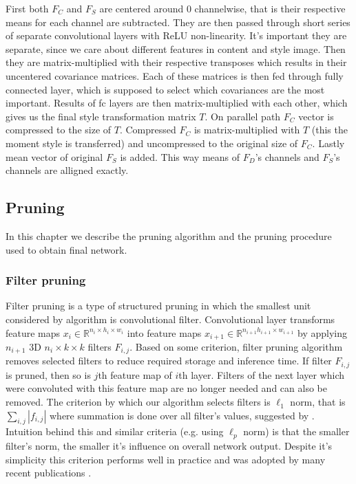 \documentclass[../Main.tex]{subfiles}
\begin{document}
    First both $F_C$ and $F_S$ are centered around 0 channelwise, that is their respective 
    means for each channel are subtracted. They are then passed through short series of separate 
    convolutional layers with ReLU non-linearity. It's important they are separate,
    since we care about different features in content and style image. Then they 
    are matrix-multiplied with their respective transposes which results in
    their uncentered covariance matrices. Each of these matrices is then fed 
    through fully connected layer, which is supposed to select which covariances
    are the most important. Results of fc layers are then matrix-multiplied
    with each other, which gives us the final style transformation matrix $T$.
    On parallel path $F_C$ vector is compressed to the size of $T$. Compressed 
    $F_C$ is matrix-multiplied with $T$ (this the moment style is transferred)
    and uncompressed to the original size of $F_C$. Lastly mean vector of original $F_S$
    is added. This way means of $F_D$'s channels and $F_S$'s channels are alligned
    exactly.
    
    
    
    
    
    
    
    

\subsection{Pruning}
    In this chapter we describe the pruning algorithm and the pruning procedure 
    used to obtain final network.
    \subsubsection{Filter pruning} 
    Filter pruning is a type of structured pruning in which the smallest unit considered by
    algorithm is convolutional filter. Convolutional layer transforms feature maps
    $x_i \in \mathbb{R}^{n_i \times h_i\times w_i}$ into
    feature maps  $x_{i+1} \in \mathbb{R}^{n_{i+1}h_{i+1} \times w_{i+1}}$ by applying
    $n_{i+1}$ 3D $n_i \times k \times k$ filters $F_{i,j}$. Based on some criterion, filter pruning 
    algorithm removes selected filters to reduce required storage and inference time.
    If filter $F_{i,j}$ is pruned, then so is $j$th feature map of $i$th layer. 
    Filters of the next layer which were convoluted with this feature map are no longer needed 
    and can also be removed. 
    The criterion by which our algorithm selects filters is  
    $\ell_1$ norm, that is $\sum_{i,j}|f_{i,j}|$ where summation is done
    over all filter's values, suggested by \cite{li2016pruning}.
    Intuition behind this and similar criteria (e.g. using 
    $\ell_p$ norm) is that the smaller filter's norm, the smaller it's influence 
    on overall network output. Despite it's simplicity this criterion performs well in practice
    and was adopted by many recent publications \cite{lottery1, lottery2}.
    
\end{document}
